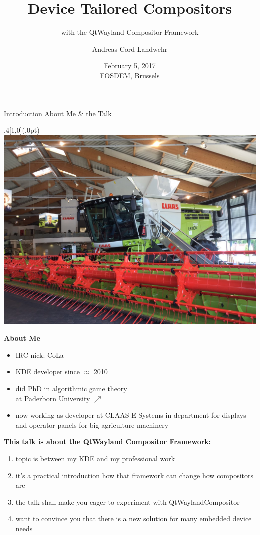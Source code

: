 \documentclass[ucs,9pt]{beamer}
\title[Device Tailored Wayland Compositors]{Device Tailored Compositors}
\subtitle{with the QtWayland-Compositor Framework}
\author{Andreas Cord-Landwehr}
\date{\textnormal{February 5, 2017\\[\medskipamount] FOSDEM, Brussels}}
\begin{document}
\maketitle

\begin{frame}
    {Introduction}
    {About Me \& the Talk}

    \begin{textblock*}{.4\paperwidth}[1,0](\paperwidth,0pt)%
        \includegraphics[width=\linewidth]{lexion.jpg}
    \end{textblock*}%

    \textbf{About Me}
    \begin{itemize}
        \item IRC-nick: CoLa
        \item KDE developer since $\approx$ 2010
        \item did PhD in algorithmic game theory\\ at Paderborn University \hspace{2.5cm}$\nearrow$
        \item now working as developer at CLAAS E-Systems in department for displays and operator panels for big agriculture machinery
    \end{itemize}
    \bigskip

    \textbf{This talk is about the QtWayland Compositor Framework:}
    \begin{enumerate}
        \item topic is between my KDE and my professional work
        \item it's a practical introduction how that framework can change how compositors are
        \item the talk shall make you eager to experiment with QtWaylandCompositor
        \item want to convince you that there is a new solution for many embedded device needs
    \end{enumerate}
\end{frame}
\end{document}
